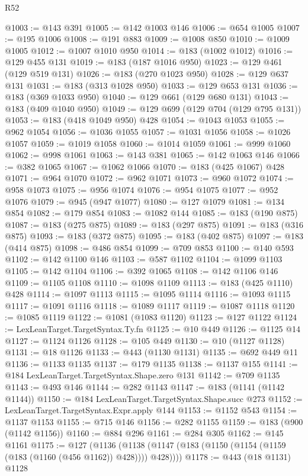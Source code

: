 \begin{lexlean}{R52}
\begin{coremodule}
@1003 := @143 @391
@1005 := @142 @1003 @146
@1006 := @654 @1005
@1007 := @195 @1006
@1008 := @191 @883
@1009 := @1008 @850
@1010 := @1009 @1005
@1012 := @1007 @1010 @950
@1014 := @183 (@1002 @1012)
@1016 := @129 @455 @131
@1019 := @183 (@187 @1016 @950)
@1023 := @129 @461 (@129 @519 @131)
@1026 := @183 (@270 @1023 @950)
@1028 := @129 @637 @131
@1031 := @183 (@313 @1028 @950)
@1033 := @129 @653 @131
@1036 := @183 (@369 @1033 @950)
@1040 := @129 @661 (@129 @680 @131)
@1043 := @183 (@409 @1040 @950)
@1049 := @129 @699 (@129 @704 (@129 @795 @131))
@1053 := @183 (@418 @1049 @950) @428
@1054 := @1043 @1053
@1055 := @962 @1054
@1056 := @1036 @1055
@1057 := @1031 @1056
@1058 := @1026 @1057
@1059 := @1019 @1058
@1060 := @1014 @1059
@1061 := @999 @1060
@1062 := @998 @1061
@1063 := @143 @381
@1065 := @142 @1063 @146
@1066 := @382 @1065
@1067 := @1062 @1066
@1070 := @183 (@425 @1067) @428
@1071 := @964 @1070
@1072 := @962 @1071
@1073 := @960 @1072
@1074 := @958 @1073
@1075 := @956 @1074
@1076 := @954 @1075
@1077 := @952 @1076
@1079 := @945 (@947 @1077)
@1080 := @127 @1079
@1081 := @134 @854
@1082 := @179 @854
@1083 := @1082 @144
@1085 := @183 (@190 @875)
@1087 := @183 (@275 @875)
@1089 := @183 (@297 @875)
@1091 := @183 (@316 @875)
@1093 := @183 (@372 @875)
@1095 := @183 (@402 @875)
@1097 := @183 (@414 @875)
@1098 := @486 @854
@1099 := @709 @853
@1100 := @140 @593
@1102 := @142 @1100 @146
@1103 := @587 @1102
@1104 := @1099 @1103
@1105 := @142 @1104
@1106 := @392 @1065
@1108 := @142 @1106 @146
@1109 := @1105 @1108
@1110 := @1098 @1109
@1113 := @183 (@425 @1110) @428
@1114 := @1097 @1113
@1115 := @1095 @1114
@1116 := @1093 @1115
@1117 := @1091 @1116
@1118 := @1089 @1117
@1119 := @1087 @1118
@1120 := @1085 @1119
@1122 := @1081 (@1083 @1120)
@1123 := @127 @1122
@1124 := LexLeanTarget.TargetSyntax.Ty.fn
@1125 := @10 @449
@1126 := @1125 @14
@1127 := @1124 @1126
@1128 := @105 @449
@1130 := @10 (@1127 @1128)
@1131 := @18 @1126
@1133 := @443 (@1130 @1131)
@1135 := @692 @449 @11
@1136 := @1133 @1135
@1137 := @179 @1135
@1138 := @1137 @155
@1141 := @184 LexLeanTarget.TargetSyntax.Shape.zero @131
@1142 := @709 @1135
@1143 := @493 @146
@1144 := @282 @1143
@1147 := @183 (@1141 (@1142 @1144))
@1150 := @184 LexLeanTarget.TargetSyntax.Shape.succ @273
@1152 := LexLeanTarget.TargetSyntax.Expr.apply @144
@1153 := @1152 @543
@1154 := @1137 @1153
@1155 := @715 @146
@1156 := @282 @1155
@1159 := @183 (@900 (@1142 @1156))
@1160 := @884 @296
@1161 := @284 @305
@1162 := @145 @1161
@1175 := @127
    (@1136 (@1138 (@1147 (@183 (@1150 (@1154 (@1159 (@183 (@1160 (@456 @1162)) @428)))) @428))))
@1178 := @443 (@18 @1131) @1128

\end{coremodule}
\end{lexlean}

